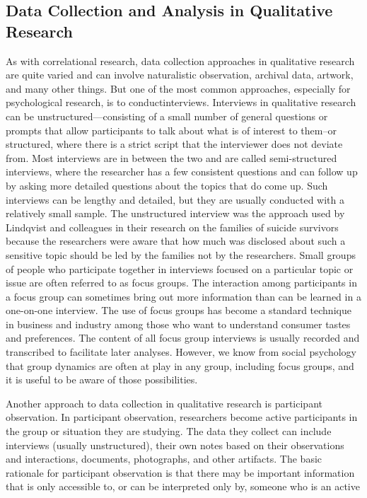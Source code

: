 \subsection{Data Collection and Analysis in Qualitative Research}

As with correlational research, data collection approaches in qualitative research are quite varied and can involve naturalistic observation, archival data, artwork, and many other things. But one of the most common approaches, especially for psychological research, is to conductinterviews. Interviews in qualitative research can be unstructured---consisting of a small number of general questions or prompts that allow participants to talk about what is of interest to them–or structured, where there is a strict script that the interviewer does not deviate from. Most interviews are in between the two and are called semi-structured interviews, where the researcher has a few consistent questions and can follow up by asking more detailed questions about the topics that do come up. Such interviews can be lengthy and detailed, but they are usually conducted with a relatively small sample. The unstructured interview was the approach used by Lindqvist and colleagues in their research on the families of suicide survivors because the researchers were aware that how much was disclosed about such a sensitive topic should be led by the families not by the researchers. Small groups of people who participate together in interviews focused on a particular topic or issue are often referred to as focus groups. The interaction among participants in a focus group can sometimes bring out more information than can be learned in a one-on-one interview. The use of focus groups has become a standard technique in business and industry among those who want to understand consumer tastes and preferences. The content of all focus group interviews is usually recorded and transcribed to facilitate later analyses. However, we know from social psychology that group dynamics are often at play in any group, including focus groups, and it is useful to be aware of those possibilities.

Another approach to data collection in qualitative research is participant observation. In participant observation, researchers become active participants in the group or situation they are studying. The data they collect can include interviews (usually unstructured), their own notes based on their observations and interactions, documents, photographs, and other artifacts. The basic rationale for participant observation is that there may be important information that is only accessible to, or can be interpreted only by, someone who is an active

